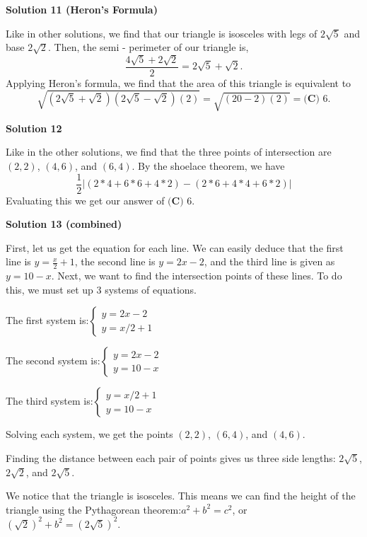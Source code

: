 \begin{enumerate}
 



\textbf{Solution 11 (Heron's Formula)}

Like in other solutions, we find that our triangle is isosceles with legs of $2\sqrt5$ and base $2\sqrt2$. Then, the semi - perimeter of our triangle is, 
 \[\frac{4\sqrt5+2\sqrt2}{2} = 2\sqrt5 + \sqrt2.\] Applying Heron's formula, we find that the area of this triangle is equivalent to 
 \[\sqrt{{(2\sqrt5+\sqrt2)}{(2\sqrt5-\sqrt2)}{(2)}} = \sqrt{{(20-2)}{(2)}} = \boxed{\textbf{(C) }6}.\]




\textbf{Solution 12}

Like in the other solutions, we find that the three points of intersection are $(2, 2)$, $(4, 6)$, and $(6, 4)$. By the shoelace theorem, we have 
 \[\dfrac{1}{2} \left|(2*4 + 6*6 + 4*2) - (2*6 + 4*4 + 6*2) \right|\] Evaluating this we get our answer of $\boxed{\textbf{(C) }6}.$




\textbf{Solution 13 (combined)}

First, let us get the equation for each line. We can easily deduce that the first line is $y = \frac{x}{2} + 1$, the second line is $y = 2x-2$, and the third line is given as $y = 10 - x$. Next, we want to find the intersection points of these lines. To do this, we must set up 3 systems of equations. 

 The first system is:$\begin{cases} y = 2x-2 \\ y = x/2+1 \end{cases}$

 The second system is:$\begin{cases} y = 2x-2 \\ y = 10-x \end{cases}$

 The third system is:$\begin{cases} y = x/2+1 \\ y = 10-x \end{cases}$

 Solving each system, we get the points $(2, 2)$, $(6, 4)$, and $(4, 6)$.

 Finding the distance between each pair of points gives us three side lengths: $2\sqrt{5}$, $2\sqrt{2}$, and $2\sqrt{5}$.

 We notice that the triangle is isosceles. This means we can find the height of the triangle using the Pythagorean theorem:$a^2+b^2=c^2$, or $(\sqrt{2})^2+b^2=(2\sqrt{5})^2$.


\end{enumerate}
